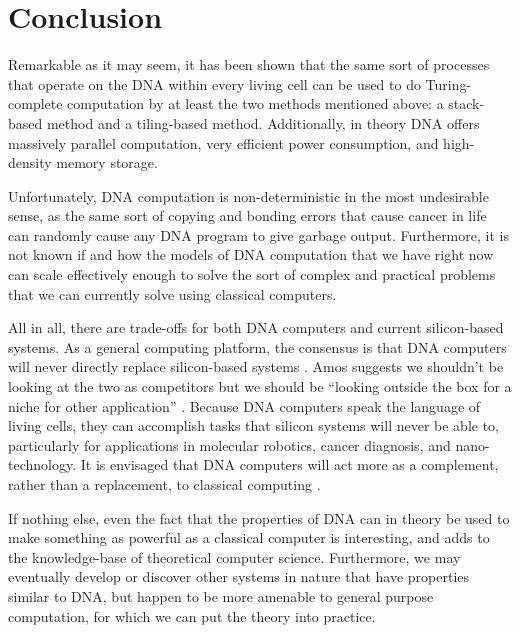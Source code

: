 \documentclass[twocolumn]{article}
\begin{document}
\section{Conclusion}

Remarkable as it may seem, it has been shown that the same sort of processes
that operate on the DNA within every living cell can be used to do
Turing-complete computation by at least the two methods mentioned above:
a stack-based method and a tiling-based method. Additionally, in theory DNA
offers massively
parallel computation, very efficient power consumption, and high-density memory
storage.

Unfortunately, DNA computation is non-deterministic in the most undesirable
sense, as the same sort of copying and bonding errors that cause cancer in life
can randomly cause any DNA program to give garbage output. Furthermore, it is
not known if and how
the models of DNA computation that we have right now can scale effectively
enough to solve the sort of complex and practical problems that we can
currently solve using classical computers.

All in all, there are trade-offs for both DNA computers and current
silicon-based
systems. As a general computing platform, the consensus is that DNA
computers will never directly replace silicon-based systems 
\cite{parker}. Amos
suggests we shouldn't be looking at the two as competitors but we
should be ``looking outside the box for a niche for other application''
\cite{parker}. Because DNA computers speak the language of living cells, they
can accomplish tasks that silicon systems will never be able to, particularly
for applications in molecular robotics, cancer diagnosis, and nano-technology.
It is
envisaged that DNA computers will act more as a complement, rather
than a replacement, to classical computing \cite{kari}.

If nothing else, even the fact that the properties of DNA can in theory be
used to make something as powerful as
a classical computer is interesting, and adds to the knowledge-base of
theoretical computer science. Furthermore, we may eventually develop or
discover
other systems in nature that have properties similar to DNA, but happen to be
more amenable to general purpose computation, for which we can put the
theory into practice.

\newpage

{}

\end{document}
